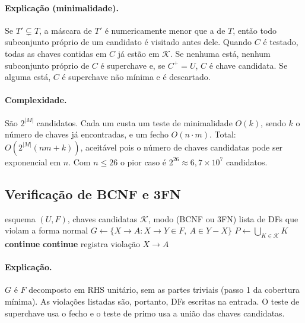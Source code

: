 \documentclass[11pt,a4paper]{article}
\newcommand{\fd}[2]{\ensuremath{#1 \to #2}}
\newcommand{\cl}[1]{\ensuremath{#1^{+}}}
\newcommand{\cmd}[1]{\texttt{#1}}
\begin{document}
\paragraph{Explicação (minimalidade).} Se $T' \subsetneq T$, a máscara de $T'$ é
numericamente menor que a de $T$, então todo subconjunto próprio de um
candidato é visitado antes dele. Quando $C$ é testado, todas as chaves contidas
em $C$ já estão em $\mathcal{K}$. Se nenhuma está, nenhum subconjunto próprio
de $C$ é superchave e, se $\cl{C} = U$, $C$ é chave candidata. Se alguma
está, $C$ é superchave não mínima e é descartado.

\paragraph{Complexidade.} São $2^{|M|}$ candidatos. Cada um custa um teste de
minimalidade $O(k)$, sendo $k$ o número de chaves já encontradas, e um fecho
$O(n \cdot m)$. Total: $O(2^{|M|} (n m + k))$, aceitável pois o número de
chaves candidatas pode ser exponencial em $n$. Com $n \le 26$ o pior caso é
$2^{26} \approx 6{,}7 \times 10^7$ candidatos.






\subsection{Verificação de BCNF e 3FN}

\begin{algorithm}[H]
    \caption{Verificação de formas normais (\cmd{nf\_violations})}
    \begin{algorithmic}[1]
        \Require esquema $(U, F)$, chaves candidatas $\mathcal{K}$, modo (BCNF ou 3FN)
        \Ensure lista de DFs que violam a forma normal
        \State $G \gets \{\fd{X}{A} : \fd{X}{Y} \in F,\ A \in Y - X\}$ 
        \State $P \gets \bigcup_{K \in \mathcal{K}} K$ 
        \ForAll{$\fd{X}{A} \in G$}
        \If{$\cl{X} = U$} \textbf{continue} 
        \EndIf
         \textbf{continue} 
        \EndIf
        \State registra violação \fd{X}{A}
        \EndFor
    \end{algorithmic}
\end{algorithm}

\paragraph{Explicação.} $G$ é $F$ decomposto em RHS unitário, sem as partes
triviais (passo 1 da cobertura mínima). As violações listadas são, portanto,
DFs escritas na entrada. O teste de superchave usa o fecho e o teste de primo
usa a união das chaves candidatas.
\end{document}
